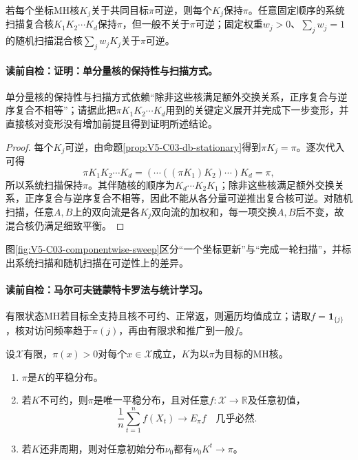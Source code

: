 \begin{proposition}[单分量核的保持性与扫描方式]\label{prop:V5-C03-component-scan}
若每个坐标MH核$K_j$关于共同目标$\pi$可逆，则每个$K_j$保持$\pi$。任意固定顺序的系统扫描复合核$K_1K_2\cdots K_d$保持$\pi$，但一般不关于$\pi$可逆；固定权重$w_j>0$、$\sum_jw_j=1$的随机扫描混合核$\sum_jw_jK_j$关于$\pi$可逆。
\end{proposition}
\paragraph{读前自检：证明：单分量核的保持性与扫描方式。}单分量核的保持性与扫描方式依赖“除非这些核满足额外交换关系，正序复合与逆序复合不相等”；请据此把$\pi K_1K_2\cdots K_d$用到的关键定义展开并完成下一步变形，并直接核对变形没有增加前提且得到证明所述结论。\par

\begin{proof}
每个$K_j$可逆，由命题\ref{prop:V5-C03-db-stationary}得到$\pi K_j=\pi$。逐次代入可得
\[
\pi K_1K_2\cdots K_d
=(\cdots((\pi K_1)K_2)\cdots)K_d
=\pi,
\]
所以系统扫描保持$\pi$。其伴随核的顺序为$K_d\cdots K_2K_1$；除非这些核满足额外交换关系，正序复合与逆序复合不相等，因此不能从各分量可逆推出复合核可逆。对随机扫描，任意$A,B$上的双向流是各$K_j$双向流的加权和，每一项交换$A,B$后不变，故混合核仍满足细致平衡。
\end{proof}
图\ref{fig:V5-C03-componentwise-sweep}区分“一个坐标更新”与“完成一轮扫描”，并标出系统扫描和随机扫描在可逆性上的差异。


\paragraph{读前自检：马尔可夫链蒙特卡罗法与统计学习。}有限状态MH若目标全支持且核不可约、正常返，则遍历均值成立；请取$f=\mathbf1_{\{j\}}$，核对访问频率趋于$\pi(j)$，再由有限求和推广到一般$f$。\par

\begin{theorem}[有限状态MH的正确性条件]\label{thm:V5-C03-finite-correctness}
设$\mathcal X$有限，$\pi(x)>0$对每个$x\in\mathcal X$成立，$K$为以$\pi$为目标的MH核。
\begin{enumerate}[leftmargin=2.2em]
  \item $\pi$是$K$的平稳分布。
  \item 若$K$不可约，则$\pi$是唯一平稳分布，且对任意$f:\mathcal X\to\mathbb R$及任意初值，
  \[
  \frac1n\sum_{t=1}^nf(X_t)\longrightarrow E_\pi f
  \quad\text{几乎必然}.
  \]
  \item 若$K$还非周期，则对任意初始分布$\nu_0$都有$\nu_0K^t\to\pi$。
\end{enumerate}
\end{theorem}
